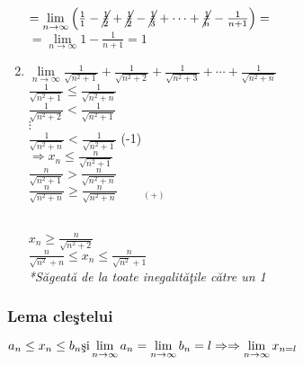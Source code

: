 \documentclass[a4paper, 12pt, notitlepage]{book}
\begin{document}
\begin{enumerate}
            $= \lim\limits_{n\to\infty} \left( {1 \over 1} - \cancel{1 \over 2} + \cancel{1 \over 2} - \cancel{1 \over 3} + \cdots + \cancel{1 \over n} - {1 \over n+1} \right) =$\\[5pt]
            $= \lim\limits_{n\to\infty} 1 - \frac{1}{n+1} = 1$
      \item $\lim\limits_{n\to\infty} \frac{1}{\sqrt{n^{2}+1}} + \frac{1}{\sqrt{n^{2}+2}} + \frac{1}{\sqrt{n^{2}+3}} + \cdots + \frac{1}{\sqrt{n^{2}+n}}$\\[5pt]
            $\frac{1}{\sqrt{n^{2}+1}} \le \frac{1}{\sqrt{n^{2}+n}}$\\[5pt]
            $\frac{1}{\sqrt{n^{2}+2}} < \frac{1}{\sqrt{n^{2}+1}}$\\[5pt]
            $\vdots$\\[5pt]
            $\frac{1}{\sqrt{n^{2}+n}} < \frac{1}{\sqrt{n^{2}+1}}$ \;\; \small{(-1)}\\[5pt]
            $\Rightarrow x_{n} \le \frac{n}{\sqrt{n^{2}+1}}$\\[5pt]
            $\frac{n}{\sqrt{n^{2}+1}} > \frac{n}{\sqrt{n^{2}+n}}$\\[5pt]
            $\frac{n}{\sqrt{n^{2}+n}} \ge \frac{n}{\sqrt{n^{2}+n}} \quad\quad _{(+)}$\\
            \\
            $x_{n} \ge \frac{n}{\sqrt{n^{2}+2}}$\\[5pt]

            $\frac{n}{\sqrt{n^{2}}+n} \le x_{n} \le \frac{n}{\sqrt{n^{2}}+1}$\\[5pt]
            \textit{*S\u{a}geat\u{a} de la toate inegalit\u{a}\c{t}ile c\u{a}tre un 1}
    \end{enumerate}
    \subsubsection{Lema cle\c{s}telui}
    \begin{math}
      a_{n} \le x_{n} \le b_{n} \text{\c{s}i} \lim\limits_{n\to\infty} a_{n} = \lim\limits_{n\to\infty} b_{n} = l \Rightarrow \\[5pt]
      \Rightarrow \lim\limits_{n\to\infty} x_{n = l}
    \end{math}
\end{document}
